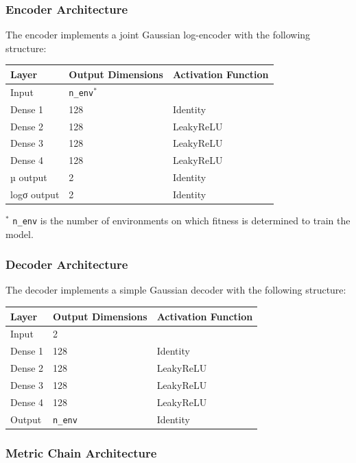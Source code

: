 \documentclass[
]{scrartcl}
\begin{document}
\begin{refsection}
\subsubsection{Encoder Architecture}\label{encoder-architecture}

The encoder implements a joint Gaussian log-encoder with the following
structure:

\begin{longtable}[]{@{}lll@{}}
\toprule\noalign{}
Layer & Output Dimensions & Activation Function \\
\midrule\noalign{}
\endhead
\bottomrule\noalign{}
\endlastfoot
Input & \texttt{n\_env}\(^*\) & \\
Dense 1 & 128 & Identity \\
Dense 2 & 128 & LeakyReLU \\
Dense 3 & 128 & LeakyReLU \\
Dense 4 & 128 & LeakyReLU \\
µ output & 2 & Identity \\
logσ output & 2 & Identity \\
\end{longtable}

\(^*\) \texttt{n\_env} is the number of environments on which fitness is
determined to train the model.

\subsubsection{Decoder Architecture}\label{decoder-architecture}

The decoder implements a simple Gaussian decoder with the following
structure:

\begin{longtable}[]{@{}lll@{}}
\toprule\noalign{}
Layer & Output Dimensions & Activation Function \\
\midrule\noalign{}
\endhead
\bottomrule\noalign{}
\endlastfoot
Input & 2 & \\
Dense 1 & 128 & Identity \\
Dense 2 & 128 & LeakyReLU \\
Dense 3 & 128 & LeakyReLU \\
Dense 4 & 128 & LeakyReLU \\
Output & \texttt{n\_env} & Identity \\
\end{longtable}

\subsubsection{Metric Chain
Architecture}\label{metric-chain-architecture}


\end{refsection}
\end{document}
